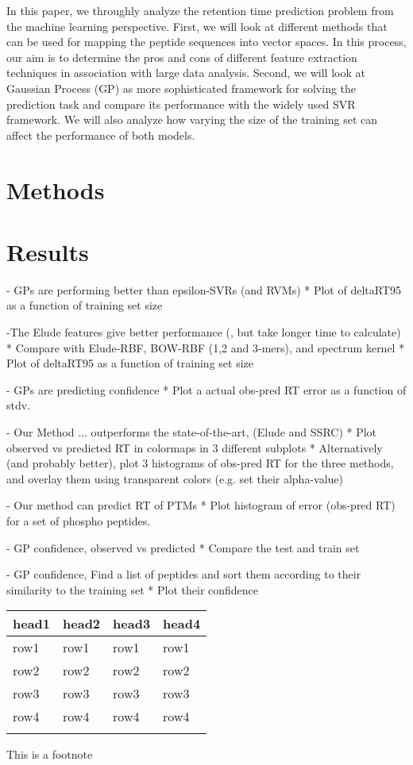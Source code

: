 \documentclass{bioinfo}
\begin{document}
In this paper, we throughly analyze the retention time prediction problem from the machine learning perspective. First, we will look at different methods that can be used for mapping the peptide sequences into vector spaces. In this process, our aim is to determine the pros and cons of different feature extraction techniques in association with large data analysis. Second, we will look at Gaussian Process (GP) \cite{Rasmussen:2006vza} as more sophisticated framework for solving the prediction task and compare its performance with the widely used SVR framework. We will also analyze how varying the size of the training set can affect the performance of both models.
\begin{methods}
\section{Methods}


\section{Results}

- GPs are performing better than epsilon-SVRs (and RVMs)
* Plot of deltaRT95 as a function of training set size

-The Elude features give better performance (, but take longer time to calculate)
* Compare with Elude-RBF, BOW-RBF (1,2 and 3-mers), and spectrum kernel
* Plot of deltaRT95 as a function of training set size

- GPs are predicting confidence
* Plot a actual obs-pred RT error as a function of stdv.

- Our Method ... outperforms the state-of-the-art, (Elude and SSRC) 
* Plot observed vs predicted RT in colormaps in 3 different subplots
* Alternatively (and probably better), plot 3 histograms of obs-pred RT for the three methods, and overlay them using transparent colors (e.g. set their alpha-value)

- Our method can predict RT of PTMs
* Plot histogram of error (obs-pred RT) for a set of phospho peptides. 

- GP confidence, observed vs predicted
* Compare the test and train set

- GP confidence, Find a list of peptides and sort them according to their similarity to the training set
* Plot their confidence 



\begin{table}[!t]
{\begin{tabular}{llll}\toprule
head1 & head2 & head3 & head4\\\midrule
row1 & row1 & row1 & row1\\
row2 & row2 & row2 & row2\\
row3 & row3 & row3 & row3\\
row4 & row4 & row4 & row4\\\botrule
\end{tabular}}{This is a footnote}
\end{table}

\end{methods}
\end{document}
